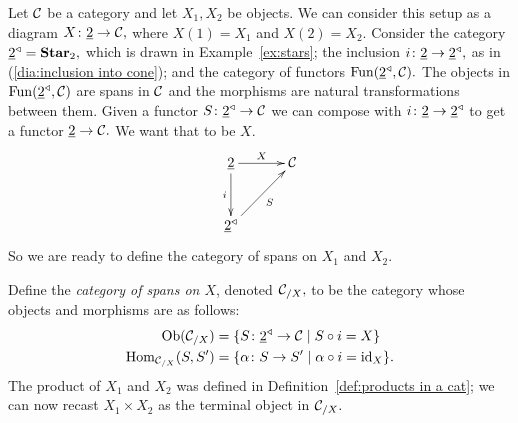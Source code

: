 \documentclass[../main/CT4S-EN-RU]{subfiles}
\begin{document}
\begin{constructionENG}[Products]
Let $\mathcal{C}$ be a category and let $X_1,X_2$ be objects. We can consider this setup as a diagram $X\colon\underline{2}\rightarrow\mathcal{C},$ where $X(1)=X_1$ and $X(2)=X_2.$ Consider the category $\underline{2}^\triangleleft={\mathbf{Star}}_2,$ which is drawn in Example~\ref{ex:stars}; the inclusion $i\colon\underline{2}\rightarrow\underline{2}^\triangleleft,$ as in (\ref{dia:inclusion into cone}); and the category of functors $\operatorname{Fun}(\underline{2}^\triangleleft,\mathcal{C}).$ The objects in $\operatorname{Fun}(\underline{2}^\triangleleft,\mathcal{C})$ are spans in $\mathcal{C}$ and the morphisms are natural transformations between them. Given a functor $S\colon\underline{2}^\triangleleft\rightarrow\mathcal{C}$ we can compose with $i\colon\underline{2}\rightarrow\underline{2}^\triangleleft$ to get a functor $\underline{2}\rightarrow\mathcal{C}.$ We want that to be $X.$
$$\xymatrix@=30pt{\ul{2}\ar[r]^{X}\ar[d]_i&\mcC\\\ul{2}\lcone\ar[ur]_S}$$
So we are ready to define the category of spans on $X_1$ and $X_2.$

Define the {\em category of spans on $X$}, denoted $\mathcal{C}_{/X},$ to be the category whose objects and morphisms are as follows:
\begin{align}\label{dia:slice for products}
\operatorname{Ob}(\mathcal{C}_{/X})&=\{S\colon\underline{2}^\triangleleft\rightarrow\mathcal{C}{\;|\;}S\circ i=X\}\\
\nonumber\operatorname{Hom}_{\mathcal{C}_{/X}}(S,S')&=\{\alpha\colon S\rightarrow S'{\;|\;}\alpha\circ i=\operatorname{id}_X\}.
\end{align}
The product of $X_1$ and $X_2$ was defined in Definition~\ref{def:products in a cat}; we can now recast $X_1\times X_2$ as the terminal object in $\mathcal{C}_{/X}.$


\end{constructionENG}
\end{document}
